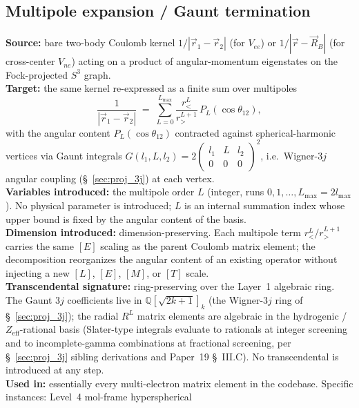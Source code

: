 \documentclass[11pt]{article}
\begin{document}
\subsection{Multipole expansion / Gaunt termination}
\label{sec:proj_multipole_gaunt}
\textbf{Source:} bare two-body Coulomb kernel $1/|\vec{r}_1 - \vec{r}_2|$
(for $V_{ee}$) or $1/|\vec{r} - \vec{R}_B|$ (for cross-center $V_{ne}$)
acting on a product of angular-momentum eigenstates on the Fock-projected
$S^3$ graph.\\
\textbf{Target:} the same kernel re-expressed as a finite sum over
multipoles
\begin{equation*}
  \frac{1}{|\vec{r}_1 - \vec{r}_2|}
  \;=\; \sum_{L=0}^{L_\text{max}}
        \frac{r_<^L}{r_>^{L+1}}\, P_L(\cos\theta_{12}),
\end{equation*}
with the angular content $P_L(\cos\theta_{12})$ contracted against
spherical-harmonic vertices via Gaunt integrals
$G(l_1, L, l_2) = 2 \begin{pmatrix} l_1 & L & l_2 \\ 0 & 0 & 0
\end{pmatrix}^{\!2}$, i.e.\ Wigner-$3j$ angular coupling
(\S~\ref{sec:proj_3j}) at each vertex.\\
\textbf{Variables introduced:} the multipole order $L$ (integer, runs
$0, 1, \dots, L_\text{max} = 2 l_\text{max}$).  No physical parameter
is introduced; $L$ is an internal summation index whose upper bound is
fixed by the angular content of the basis.\\
\textbf{Dimension introduced:} dimension-preserving.  Each multipole
term $r_<^L / r_>^{L+1}$ carries the same $[E]$ scaling as the parent
Coulomb matrix element; the decomposition reorganizes the angular
content of an existing operator without injecting a new $[L]$, $[E]$,
$[M]$, or $[T]$ scale.\\
\textbf{Transcendental signature:} ring-preserving over the Layer~1
algebraic ring.  The Gaunt $3j$ coefficients live in
$\mathbb{Q}[\sqrt{2k{+}1}]_k$ (the Wigner-$3j$ ring of
\S~\ref{sec:proj_3j}); the radial $R^L$ matrix elements are algebraic
in the hydrogenic / $Z_\text{eff}$-rational basis (Slater-type
integrals evaluate to rationals at integer screening and to
incomplete-gamma combinations at fractional screening, per
\S~\ref{sec:proj_3j} sibling derivations and Paper~19 \S~III.C).  No
transcendental is introduced at any step.\\
\textbf{Used in:} essentially every multi-electron matrix element in
the codebase.  Specific instances: Level~4 mol-frame hyperspherical
\end{document}
